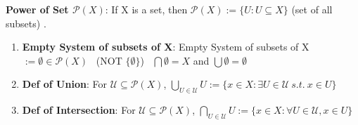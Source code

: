 \documentclass[9pt]{article}
\begin{document}
\textbf{Power of Set $\mathcal{P}(X)$}: If X is a set, then $\mathcal{P}(X):=\{U:U\subseteq X\}$ {\scriptsize (set of all subsets)} \quad {}.

\begin{enumerate}[itemsep=-2pt, topsep=-2pt]
    \item \textbf{Empty System of subsets of X}: Empty System of subsets of X $:=\emptyset\in\mathcal{P}(X)$ \ {\scriptsize (NOT $\{\emptyset\}$)} \quad \quad \quad \star \ $\bigcap\emptyset=X$ \quad and \quad $\bigcup\emptyset=\emptyset$ \ \star
    \item \textbf{Def of Union}: For $\mathcal{U}\subseteq\mathcal{P}(X)$, $\bigcup_{U\in\mathcal{U}}U:=\{x\in X:\exists U\in\mathcal{U} \ s.t. \ x\in U\}$
    \item \textbf{Def of Intersection}: For $\mathcal{U}\subseteq\mathcal{P}(X)$, $\bigcap_{U\in\mathcal{U}}U:=\{x\in X:\forall U\in\mathcal{U},x\in U\}$
\end{enumerate}
\end{document}
